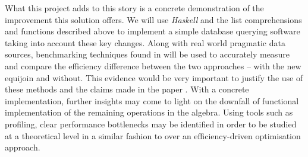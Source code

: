 What this project adds to this story is a concrete demonstration of the improvement this solution offers.
We will use \emph{Haskell} and the list comprehensions and functions described above to implement a simple database querying software taking into account these key changes. Along with real world pragmatic data sources, benchmarking techniques found in  will be used to accurately measure and compare the efficiency difference between the two approaches -- with the new equijoin and without. This evidence would be very important to justify the use of these methods and the claims made in the paper \cite{RelationalAlgebraByWayOfAdjunctions}.
With a concrete implementation, further insights may come to light on the downfall of functional implementation of the remaining operations in the algebra. Using tools such as profiling, clear performance bottlenecks may be identified in order to be studied at a theoretical level in a similar fashion to \cite{RelationalAlgebraByWayOfAdjunctions} over an efficiency-driven optimisation approach.
